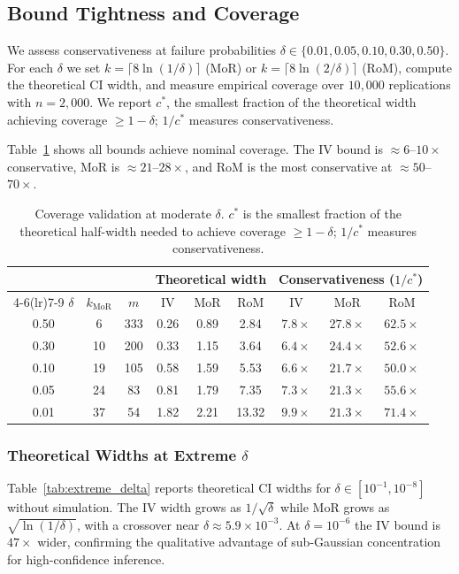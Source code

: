 \subsection{Bound Tightness and Coverage}
\label{sec:sim_coverage}

We assess conservativeness at failure probabilities $\delta \in \{0.01, 0.05, 0.10, 0.30, 0.50\}$. For each $\delta$ we set $k = \lceil 8\ln(1/\delta) \rceil$ (MoR) or $k = \lceil 8\ln(2/\delta) \rceil$ (RoM), compute the theoretical CI width, and measure empirical coverage over $10{,}000$ replications with $n = 2{,}000$. We report $c^*$, the smallest fraction of the theoretical width achieving coverage $\geq 1-\delta$; $1/c^*$ measures conservativeness.

Table~\ref{tab:coverage} shows all bounds achieve nominal coverage. The IV bound is $\approx 6$--$10\times$ conservative, MoR is $\approx 21$--$28\times$, and RoM is the most conservative at $\approx 50$--$70\times$.

\begin{table}[t]
\centering
\caption{Coverage validation at moderate $\delta$. $c^*$ is the smallest fraction of the theoretical half-width needed to achieve coverage $\geq 1 - \delta$; $1/c^*$ measures conservativeness.}
\label{tab:coverage}
\renewcommand{\arraystretch}{1.3}
\begin{tabular}{ccccccccc}
\toprule
 & & & \multicolumn{3}{c}{Theoretical width} & \multicolumn{3}{c}{Conservativeness ($1/c^*$)} \\
\cmidrule(lr){4-6}\cmidrule(lr){7-9}
$\delta$ & $k_{\mathrm{MoR}}$ & $m$ & IV & MoR & RoM & IV & MoR & RoM \\
\midrule
0.50 &  6 & 333 & 0.26 & 0.89 & 2.84 & $7.8\times$ & $27.8\times$ & $62.5\times$ \\
0.30 & 10 & 200 & 0.33 & 1.15 & 3.64 & $6.4\times$ & $24.4\times$ & $52.6\times$ \\
0.10 & 19 & 105 & 0.58 & 1.59 & 5.53 & $6.6\times$ & $21.7\times$ & $50.0\times$ \\
0.05 & 24 &  83 & 0.81 & 1.79 & 7.35 & $7.3\times$ & $21.3\times$ & $55.6\times$ \\
0.01 & 37 &  54 & 1.82 & 2.21 & 13.32 & $9.9\times$ & $21.3\times$ & $71.4\times$ \\
\bottomrule
\end{tabular}
\end{table}

\subsubsection{Theoretical Widths at Extreme $\delta$}
Table~\ref{tab:extreme_delta} reports theoretical CI widths for $\delta \in [10^{-1}, 10^{-8}]$ without simulation. The IV width grows as $1/\sqrt{\delta}$ while MoR grows as $\sqrt{\ln(1/\delta)}$, with a crossover near $\delta \approx 5.9 \times 10^{-3}$. At $\delta = 10^{-6}$ the IV bound is $47\times$ wider, confirming the qualitative advantage of sub-Gaussian concentration for high-confidence inference.


